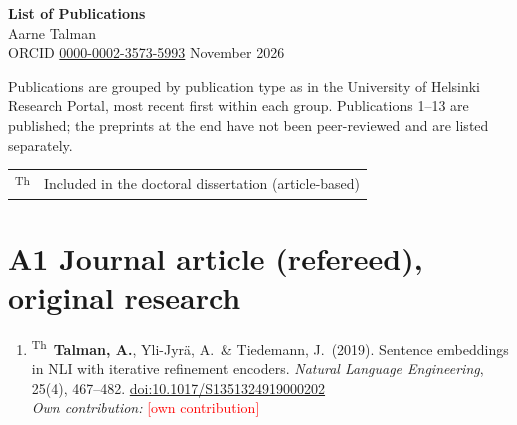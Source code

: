 \documentclass[12pt,a4paper]{article}
\newcommand{\fillin}[1]{\textcolor{red}{[#1]}}
\newcommand{\me}{\textbf{Talman, A.}}
\newcommand{\thesis}{\textsuperscript{Th}}    %
\newcommand{\contrib}[1]{\\\textit{Own contribution:} #1}
\begin{document}
\begin{center}
  {\Large\bfseries List of Publications}\\[2pt]
  {\large Aarne Talman}\\[2pt]
  ORCID \href{https://orcid.org/0000-0002-3573-5993}{0000-0002-3573-5993}  November 2026
\end{center}

\medskip
Publications are grouped by publication type as in the University of Helsinki Research Portal, most recent first within each group. Publications 1--13 are published; the preprints at the end have not been peer-reviewed and are listed separately.

\smallskip
\begin{tabular}{@{}ll@{}}
  \thesis & Included in the doctoral dissertation (article-based) \\
\end{tabular}

\section{A1 Journal article (refereed), original research}
\begin{enumerate}[series=pubs]
  \item \thesis\ \me, Yli-Jyrä, A.\ \& Tiedemann, J.\ (2019). Sentence embeddings in NLI with iterative refinement encoders. \emph{Natural Language Engineering}, 25(4), 467--482. \href{https://doi.org/10.1017/S1351324919000202}{doi:10.1017/S1351324919000202}
  \contrib{\fillin{own contribution}}
\end{enumerate}
\end{document}
